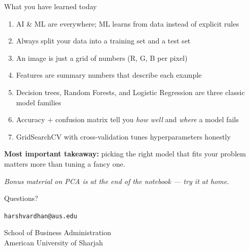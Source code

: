 \documentclass[aspectratio=169, 11pt]{beamer}
\begin{document}
\begin{frame}{What you have learned today}
    \begin{enumerate}
        \item AI \& ML are everywhere; ML learns from data instead of explicit rules
        \item Always split your data into a training set and a test set
        \item An image is just a grid of numbers (R, G, B per pixel)
        \item Features are summary numbers that describe each example
        \item Decision trees, Random Forests, and Logistic Regression are three classic model families
        \item Accuracy + confusion matrix tell you \emph{how well} and \emph{where} a model fails
        \item GridSearchCV with cross-validation tunes hyperparameters honestly
    \end{enumerate}

    \vspace{0.4cm}
    \textcolor{ausred}{\textbf{Most important takeaway:} picking the right model that fits your problem matters more than tuning a fancy one.}

    \vspace{0.3cm}
    \footnotesize\textit{Bonus material on PCA is at the end of the notebook — try it at home.}
\end{frame}

\begin{frame}
    \centering
    \Huge Questions?

    \vspace{1cm}

    \normalsize
    \texttt{harshvardhan@aus.edu}

    \vspace{0.5cm}
    School of Business Administration\\
    American University of Sharjah
\end{frame}
\end{document}
